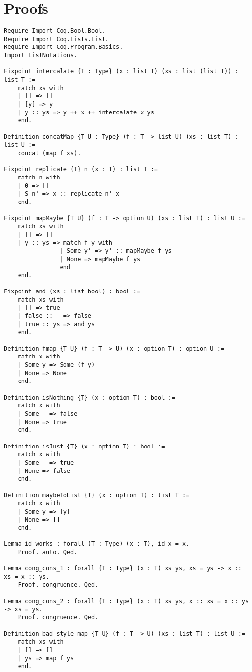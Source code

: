 \chapter{Proofs}
\label{app:proofs}

\begin{verbatim}
Require Import Coq.Bool.Bool.
Require Import Coq.Lists.List.
Require Import Coq.Program.Basics.
Import ListNotations.

Fixpoint intercalate {T : Type} (x : list T) (xs : list (list T)) : list T :=
    match xs with
    | [] => []
    | [y] => y
    | y :: ys => y ++ x ++ intercalate x ys
    end.

Definition concatMap {T U : Type} (f : T -> list U) (xs : list T) : list U :=
    concat (map f xs).

Fixpoint replicate {T} n (x : T) : list T :=
    match n with
    | 0 => []
    | S n' => x :: replicate n' x
    end.

Fixpoint mapMaybe {T U} (f : T -> option U) (xs : list T) : list U :=
    match xs with
    | [] => []
    | y :: ys => match f y with
                | Some y' => y' :: mapMaybe f ys
                | None => mapMaybe f ys
                end
    end.

Fixpoint and (xs : list bool) : bool :=
    match xs with
    | [] => true
    | false :: _ => false
    | true :: ys => and ys
    end.

Definition fmap {T U} (f : T -> U) (x : option T) : option U :=
    match x with
    | Some y => Some (f y)
    | None => None
    end.

Definition isNothing {T} (x : option T) : bool :=
    match x with
    | Some _ => false
    | None => true
    end.

Definition isJust {T} (x : option T) : bool :=
    match x with
    | Some _ => true
    | None => false
    end.

Definition maybeToList {T} (x : option T) : list T :=
    match x with
    | Some y => [y]
    | None => []
    end.

Lemma id_works : forall (T : Type) (x : T), id x = x.
    Proof. auto. Qed.

Lemma cong_cons_1 : forall {T : Type} (x : T) xs ys, xs = ys -> x :: xs = x :: ys.
    Proof. congruence. Qed.

Lemma cong_cons_2 : forall {T : Type} (x : T) xs ys, x :: xs = x :: ys -> xs = ys.
    Proof. congruence. Qed.

Definition bad_style_map {T U} (f : T -> U) (xs : list T) : list U :=
    match xs with
    | [] => []
    | ys => map f ys
    end.


\end{verbatim}
